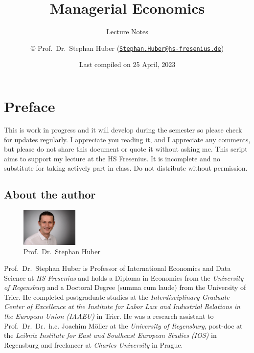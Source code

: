 \documentclass[
  12pt,
  oneside]{book}
\title{Managerial Economics}
\subtitle{Lecture Notes}
\author{© Prof.~Dr.~Stephan Huber (\href{mailto:Stephan.Huber@hs-fresenius.de}{\nolinkurl{Stephan.Huber@hs-fresenius.de}})}
\date{Last compiled on 25 April, 2023}
\theoremstyle{definition}
\theoremstyle{definition}
\theoremstyle{definition}
\theoremstyle{definition}
\theoremstyle{remark}
\begin{document}
\maketitle

{
\hypersetup{linkcolor=}
\setcounter{tocdepth}{2}
\tableofcontents
}
\hypertarget{preface}{%
\chapter*{Preface}\label{preface}}

This is work in progress and it will develop during the semester so please check for updates regularly. I appreciate you reading it, and I appreciate any comments, but please do not share this document or quote it without asking me. This script aims to support my lecture at the HS Fresenius. It is incomplete and no substitute
for taking actively part in class. Do not distribute without permission.

\hypertarget{about-the-author}{%
\section*{About the author}\label{about-the-author}}

\begin{figure}
\centering
\includegraphics[width=0.25\textwidth,height=\textheight]{fig/huber2.jpeg}
\caption[\label{fig:itsme} Prof.~Dr.~Stephan Huber]{\label{fig:itsme} Prof.~Dr.~Stephan Huber\footnotemark{}}
\end{figure}

Prof.~Dr.~Stephan Huber is Professor of International Economics and Data Science at \emph{HS Fresenius} and holds a Diploma in Economics from the \emph{University of Regensburg} and a Doctoral Degree (summa cum laude) from the University of Trier. He completed postgraduate studies at the \emph{Interdisciplinary Graduate Center of Excellence at the Institute for Labor Law and Industrial Relations in the European Union (IAAEU)} in Trier. He was a research assistant to Prof.~Dr.~Dr.~h.c. Joachim Möller at the \emph{University of Regensburg}, post-doc at the \emph{Leibniz Institute for East and Southeast European Studies (IOS)} in Regensburg and freelancer at \emph{Charles University} in Prague.
\end{document}
